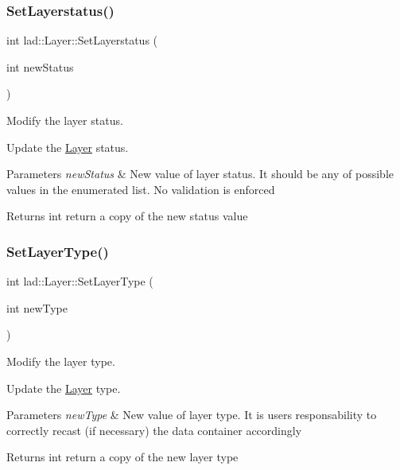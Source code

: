 \subsubsection{\texorpdfstring{Set\+Layerstatus()}{SetLayerstatus()}}
{\footnotesize\ttfamily int lad\+::\+Layer\+::\+Set\+Layerstatus (\begin{DoxyParamCaption}\item[{int}]{new\+Status }\end{DoxyParamCaption})}



Modify the layer status. 

Update the \hyperlink{classlad_1_1_layer}{Layer} status.


\begin{DoxyParams}{Parameters}
{\em new\+Status} & New value of layer status. It should be any of possible values in the enumerated list. No validation is enforced \\
\hline
\end{DoxyParams}
\begin{DoxyReturn}{Returns}
int return a copy of the new status value 
\end{DoxyReturn}
\mbox{\label{classlad_1_1_layer_a178643063c5fb55f4010579731d3025b}} 
\subsubsection{\texorpdfstring{Set\+Layer\+Type()}{SetLayerType()}}
{\footnotesize\ttfamily int lad\+::\+Layer\+::\+Set\+Layer\+Type (\begin{DoxyParamCaption}\item[{int}]{new\+Type }\end{DoxyParamCaption})}



Modify the layer type. 

Update the \hyperlink{classlad_1_1_layer}{Layer} type.


\begin{DoxyParams}{Parameters}
{\em new\+Type} & New value of layer type. It is user\textquotesingle{}s responsability to correctly recast (if necessary) the data container accordingly \\
\hline
\end{DoxyParams}
\begin{DoxyReturn}{Returns}
int return a copy of the new layer type 
\end{DoxyReturn}


